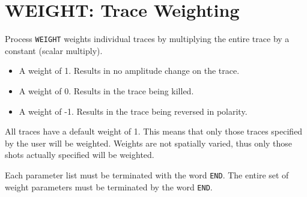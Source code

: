 \section{WEIGHT: Trace Weighting}
\label{cmd_weight}

Process \texttt{WEIGHT} weights individual traces by multiplying the entire trace
by a constant (scalar multiply).
\begin{itemize}
\item A weight of 1. Results in no amplitude change on the trace.
\item A weight of 0. Results in the trace being killed.
\item A weight of -1. Results in the trace being reversed in polarity.
\end{itemize}

All traces have a default weight of 1.  This means that only those
traces specified by the user will be weighted.  Weights are not
spatially varied, thus only those \glspl{shot} actually specified will be
weighted.

Each parameter list must be terminated with the word \texttt{END}.  The entire
set of weight parameters must be terminated by the word \texttt{END}.

